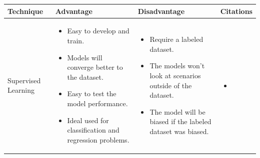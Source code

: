 \begin{longtable}{| p{23mm} | p{42mm} | p{42mm} | p{42mm} |}
\hline
    \textbf{Technique} &
    \textbf{Advantage} &
    \textbf{Disadvantage} &
    \textbf{Citations} \\ \hline
    
    Supervised Learning &
    \vspace{-8mm}
    \begin{itemize}[leftmargin=0mm,noitemsep,nolistsep,label={}] 
        \item Easy to develop and train.
        \item Models will converge better to the dataset.
        \item Easy to test the model performance.
        \item Ideal used for classification and regression problems.
        \vspace{-7mm}
    \end{itemize} &
    \vspace{-8mm}
    \begin{itemize}[leftmargin=0mm,noitemsep,nolistsep,label={}] 
            \item Require a labeled dataset.
            \item The models won’t look at scenarios outside of the dataset. 
            \item The model will be biased if the labeled dataset was biased.
            \vspace{-7mm}
    \end{itemize} &
    \vspace{-8mm}
    \begin{itemize}[leftmargin=0mm,noitemsep,nolistsep,label={}] 
        \item \cite{du2018anomaly}
        \vspace{-7mm}
    \end{itemize} \\ \hline
    

\end{longtable}
